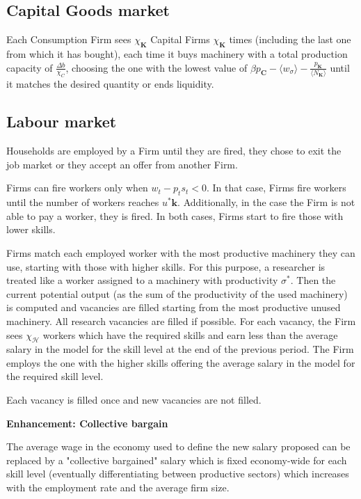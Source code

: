 \documentclass[a4paper, headings=standardclasses]{scrartcl}
\newenvironment{enh}[1][]{\begin{framed}\noindent\textbf{Enhancement: #1}\par}{\end{framed}}
\begin{document}
\subsection{Capital Goods market}
Each Consumption Firm sees $\chi_\mathbf{K}$ Capital Firms $\chi_\mathbf{K}$ times (including the last one from which it has bought), each time it buys machinery with a total production capacity of $\frac{\Delta b}{\chi_C}$, choosing the one with the lowest value of $\beta p_\mathbf{C} - \langle w_\sigma \rangle - \frac{p_\mathbf{K}}{\langle N_\mathbf{K} \rangle}$ until it matches the desired quantity or ends liquidity.

\subsection{Labour market}
Households are employed by a Firm until they are fired, they chose to exit the job market or they accept an offer from another Firm.

Firms can fire workers only when $w_t - p_t s_t < 0$. In that case, Firms fire workers until the number of workers reaches $u^* \mathbf{k}$. Additionally, in the case the Firm is not able to pay a worker, they is fired. In both cases, Firms start to fire those with lower skills.

Firms match each employed worker with the most productive machinery they can use, starting with those with higher skills. For this purpose, a researcher is treated like a worker assigned to a machinery with productivity $\sigma^*$.
Then the current potential output (as the sum of the productivity of the used machinery) is computed and vacancies are filled starting from the most productive unused machinery. All research vacancies are filled if possible.
For each vacancy, the Firm sees $\chi_\mathcal{H}$ workers which have the required skills and earn less than the average salary in the model for the skill level at the end of the previous period. The Firm employs the one with the higher skills offering the average salary in the model for the required skill level.

Each vacancy is filled once and new vacancies are not filled.

\begin{enh}[Collective bargain]
	The average wage in the economy used to define the new salary proposed can be replaced by a "collective bargained" salary which is fixed economy-wide for each skill level (eventually differentiating between productive sectors) which increases with the employment rate and the average firm size.
\end{enh}
\end{document}
